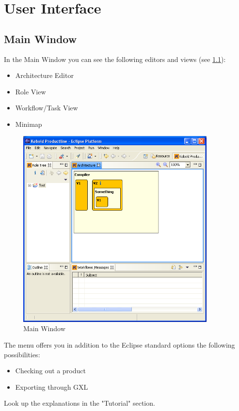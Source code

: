 \chapter{User Interface}

\section{Main Window}
In the Main Window you can see the following editors and views (see \ref{main}):
\begin{itemize}
	\item Architecture Editor
	\item Role View
	\item Workflow/Task View
	\item Minimap
\end{itemize}

\begin{figure}[h!]
\begin{center}
\includegraphics[width=10cm]{main.png}
   \caption{Main Window}
\label{main}
\end{center}
\end{figure}\par

The menu offers you in addition to the Eclipse standard options the following
possibilities:
\begin{itemize}
	\item Checking out a product
	\item Exporting through GXL
\end{itemize}
Look up the explanations in the "Tutorial" section.

